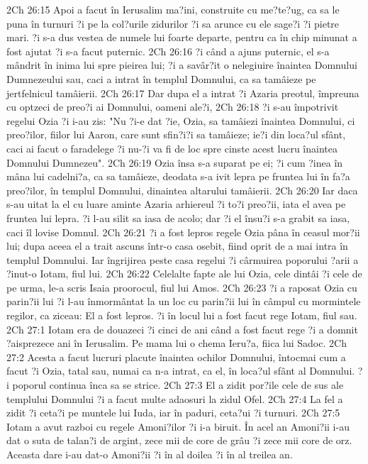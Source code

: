 2Ch 26:15  Apoi a facut în Ierusalim ma?ini, construite cu me?te?ug, ca sa le puna în turnuri ?i pe la col?urile zidurilor ?i sa arunce cu ele sage?i ?i pietre mari. ?i s-a dus vestea de numele lui foarte departe, pentru ca în chip minunat a fost ajutat ?i s-a facut puternic.
2Ch 26:16  ?i când a ajuns puternic, el s-a mândrit în inima lui spre pieirea lui; ?i a savâr?it o nelegiuire înaintea Domnului Dumnezeului sau, caci a intrat în templul Domnului, ca sa tamâieze pe jertfelnicul tamâierii.
2Ch 26:17  Dar dupa el a intrat ?i Azaria preotul, împreuna cu optzeci de preo?i ai Domnului, oameni ale?i,
2Ch 26:18  ?i s-au împotrivit regelui Ozia ?i i-au zis: "Nu ?i-e dat ?ie, Ozia, sa tamâiezi înaintea Domnului, ci preo?ilor, fiilor lui Aaron, care sunt sfin?i?i sa tamâieze; ie?i din loca?ul sfânt, caci ai facut o faradelege ?i nu-?i va fi de loc spre cinste acest lucru înaintea Domnului Dumnezeu".
2Ch 26:19  Ozia însa s-a suparat pe ei; ?i cum ?inea în mâna lui cadelni?a, ca sa tamâieze, deodata s-a ivit lepra pe fruntea lui în fa?a preo?ilor, în templul Domnului, dinaintea altarului tamâierii.
2Ch 26:20  Iar daca s-au uitat la el cu luare aminte Azaria arhiereul ?i to?i preo?ii, iata el avea pe fruntea lui lepra. ?i l-au silit sa iasa de acolo; dar ?i el însu?i s-a grabit sa iasa, caci îl lovise Domnul.
2Ch 26:21  ?i a fost lepros regele Ozia pâna în ceasul mor?ii lui; dupa aceea el a trait ascuns într-o casa osebit, fiind oprit de a mai intra în templul Domnului. Iar îngrijirea peste casa regelui ?i cârmuirea poporului ?arii a ?inut-o Iotam, fiul lui.
2Ch 26:22  Celelalte fapte ale lui Ozia, cele dintâi ?i cele de pe urma, le-a scris Isaia proorocul, fiul lui Amos.
2Ch 26:23  ?i a raposat Ozia cu parin?ii lui ?i l-au înmormântat la un loc cu parin?ii lui în câmpul cu mormintele regilor, ca ziceau: El a fost lepros. ?i în locul lui a fost facut rege Iotam, fiul sau.
2Ch 27:1  Iotam era de douazeci ?i cinci de ani când a fost facut rege ?i a domnit ?aisprezece ani în Ierusalim. Pe mama lui o chema Ieru?a, fiica lui Sadoc.
2Ch 27:2  Acesta a facut lucruri placute înaintea ochilor Domnului, întocmai cum a facut ?i Ozia, tatal sau, numai ca n-a intrat, ca el, în loca?ul sfânt al Domnului. ?i poporul continua înca sa se strice.
2Ch 27:3  El a zidit por?ile cele de sus ale templului Domnului ?i a facut multe adaosuri la zidul Ofel.
2Ch 27:4  La fel a zidit ?i ceta?i pe muntele lui Iuda, iar în paduri, ceta?ui ?i turnuri.
2Ch 27:5  Iotam a avut razboi cu regele Amoni?ilor ?i i-a biruit. În acel an Amoni?ii i-au dat o suta de talan?i de argint, zece mii de core de grâu ?i zece mii core de orz. Aceasta dare i-au dat-o Amoni?ii ?i în al doilea ?i în al treilea an.
